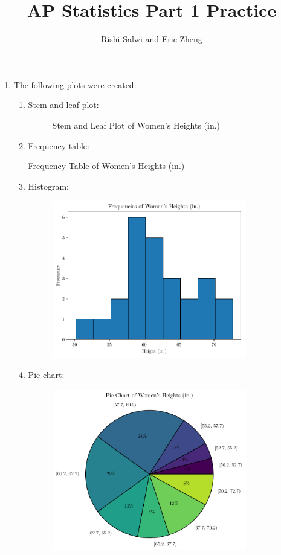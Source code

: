 \documentclass{article}
\title{AP Statistics Part 1 Practice}
\author{Rishi Salwi and Eric Zheng}
\begin{document}
\maketitle

\begin{enumerate}
  \item The following plots were created:
    \begin{enumerate}
      \item Stem and leaf plot:
        \begin{figure}[H]
          \centering
          \caption{Stem and Leaf Plot of Women's Heights (in.)}
          
        \end{figure}
      \item Frequency table:
        \begin{table}[H]
          \centering
          \caption{Frequency Table of Women's Heights (in.)}
          
        \end{table}
      \item Histogram:
        \begin{figure}[H]
          \centering
          \includegraphics[width=0.85\textwidth]{plots/histogram.pdf}
        \end{figure}
      \item Pie chart:
        \begin{figure}[H]
          \centering
          \includegraphics[width=0.85\textwidth]{plots/pie.pdf}

\end{figure}
\end{enumerate}
\end{enumerate}
\end{document}

